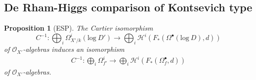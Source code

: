 \documentclass[12pt, a4paper]{article}
\newtheorem{proposition}{Proposition}[section]
\begin{document}
\subsection{De Rham-Higgs comparison of Kontsevich type}




\iffalse
\begin{proposition}[ESP]\label{prop ESP}
The Cartier isomorphism 
$$
C^{-1}:\bigoplus_i\Omega^i_{X'/k}(\mathrm{log}~D')\to\bigoplus_i\mathcal H^i(F_*(\Omega^\bullet(\mathrm{log}~D),d))
$$
of $\mathcal O_{X'}$-algebras induces an isomorphism
\begin{eqnarray}\label{Cartier iso ESP}
C^{-1}:\bigoplus_i\Omega^i_{f'}\to\bigoplus_i\mathcal H^i(F_*(\Omega^\bullet_f,d))
\end{eqnarray}
of $\mathcal O_{X'}$-algebras.
\end{proposition}
\end{document}
